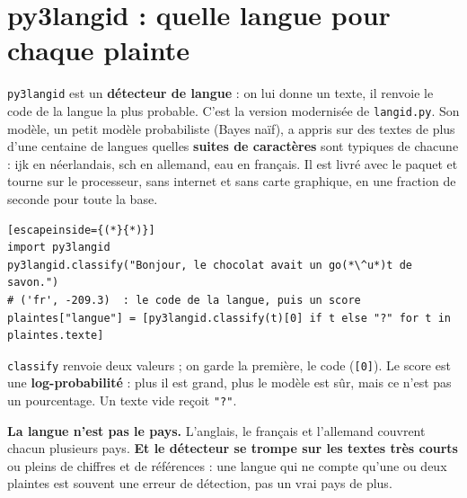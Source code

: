 \section{py3langid : quelle langue pour chaque plainte}

\begin{stepbox}[title={\faSearch\quad Ce que c'est}]
\texttt{py3langid} est un \textbf{détecteur de langue} : on lui donne un texte, il renvoie le code de la
langue la plus probable. C'est la version modernisée de \texttt{langid.py}. Son modèle, un petit modèle
probabiliste (Bayes naïf), a appris sur des textes de plus d'une centaine de langues quelles
\textbf{suites de caractères} sont typiques de chacune : \og ijk \fg{} en néerlandais, \og sch \fg{} en
allemand, \og eau \fg{} en français. Il est livré avec le paquet et tourne sur le processeur, sans internet
et sans carte graphique, en une fraction de seconde pour toute la base.
\end{stepbox}

\begin{stepbox}[title={\faCogs\quad Ce qu'il fait dans le notebook (exercice 1.4)}]
\begin{lstlisting}[escapeinside={(*}{*)}]
import py3langid
py3langid.classify("Bonjour, le chocolat avait un go(*\^u*)t de savon.")
# ('fr', -209.3)  : le code de la langue, puis un score
plaintes["langue"] = [py3langid.classify(t)[0] if t else "?" for t in plaintes.texte]
\end{lstlisting}
\texttt{classify} renvoie deux valeurs ; on garde la première, le code (\texttt{[0]}). Le score est une
\textbf{log-probabilité} : plus il est grand, plus le modèle est sûr, mais ce n'est pas un pourcentage. Un
texte vide reçoit \texttt{"?"}.
\end{stepbox}

\begin{piege}
\textbf{La langue n'est pas le pays.} L'anglais, le français et l'allemand couvrent chacun plusieurs pays.
\textbf{Et le détecteur se trompe sur les textes très courts} ou pleins de chiffres et de références : une
langue qui ne compte qu'une ou deux plaintes est souvent une erreur de détection, pas un vrai pays de plus.
\end{piege}


